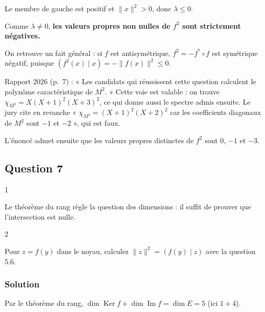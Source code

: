 \documentclass[11pt,a4paper]{article}
\begin{document}
Le membre de gauche est positif et \(\|x\|^2>0\), donc \(\lambda\le0\).

Comme \(\lambda\neq0\), \textbf{les valeurs propres non nulles de \(f^2\) sont strictement négatives.}

\begin{methode}

On retrouve un fait général : si \(f\) est antisymétrique, \(f^2=-f^*\circ f\) est symétrique négatif, puisque \((f^2(x)\mid x)=-\|f(x)\|^2\le0\).

\end{methode}

\begin{jury}

Rapport 2026 (p.~7) : « Les candidats qui réussissent cette question calculent le polynôme caractéristique de \(M^2\). » Cette voie est valable : on trouve \(\chi_{M^2}=X(X+1)^2(X+3)^2\), ce qui donne aussi le spectre admis ensuite. Le jury cite en revanche « \(\chi_{M^2}=(X+1)^2(X+2)^2\) car les coefficients diagonaux de \(M^2\) sont \(-1\) et \(-2\) », qui est faux.

\end{jury}

L'énoncé admet ensuite que les valeurs propres distinctes de \(f^2\) sont \(0\), \(-1\) et \(-3\).

\hypertarget{question-7}{%
\subsection{Question 7}\label{question-7}}

\begin{indication}{1}

Le théorème du rang règle la question des dimensions : il suffit de prouver que l'intersection est nulle.

\end{indication}

\begin{indication}{2}

Pour \(z=f(y)\) dans le noyau, calculez \(\|z\|^2=(f(y)\mid z)\) avec la question 5.6.

\end{indication}

\hypertarget{solution-13}{%
\subsubsection{Solution}\label{solution-13}}

Par le théorème du rang, \(\dim\operatorname{Ker}f+\dim\operatorname{Im}f=\dim E=5\) (ici \(1+4\)).
\end{document}
